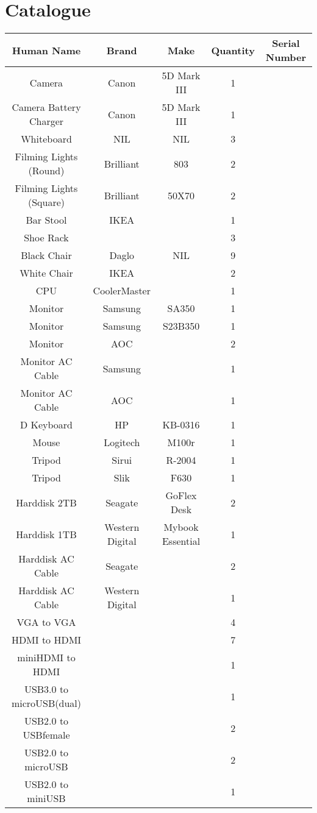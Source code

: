 \documentclass[DIV=classic,11pt,abstracton,numbers=noenddot,listof=totoc,bibliography=totoc,parskip]{scrartcl}
\title{}
\author{}
\date{}
\begin{document}
\section{Catalogue}

	\begin{tabular}{ccccc}
	\toprule
	Human Name & Brand & Make & Quantity & Serial Number\\ \midrule	
Camera & Canon & 5D Mark III & 1 & \\
Camera Battery Charger & Canon & 5D Mark III & 1 & \\
Whiteboard & NIL & NIL & 3 & \\
Filming Lights (Round) & Brilliant & 803 & 2 & \\
Filming Lights (Square) & Brilliant & 50X70 & 2 & \\
Bar Stool & IKEA & & 1 & \\
Shoe Rack &  & & 3 & \\
Black Chair & Daglo & NIL & 9 & \\
White Chair & IKEA & & 2 & \\
CPU & CoolerMaster &  & 1 & \\
Monitor & Samsung & SA350 & 1 & \\
Monitor & Samsung & S23B350 & 1 & \\
Monitor & AOC && 2 & \\
Monitor AC Cable & Samsung && 1 & \\
Monitor AC Cable & AOC && 1 & \\D
Keyboard & HP & KB-0316 & 1 & \\
Mouse & Logitech & M100r & 1 & \\
Tripod & Sirui & R-2004 & 1 & \\
Tripod & Slik & F630 & 1 & \\
Harddisk 2TB & Seagate & GoFlex Desk & 2 & \\ 
Harddisk 1TB & Western Digital & Mybook Essential & 1 & \\
Harddisk AC Cable & Seagate && 2 & \\
Harddisk AC Cable & Western Digital && 1 & \\
VGA to VGA &&& 4 & \\
HDMI to HDMI &&& 7 & \\
miniHDMI to HDMI &&& 1 &\\
USB3.0 to microUSB(dual) &&& 1 & \\
USB2.0 to USBfemale &&& 2 & \\
USB2.0 to microUSB &&& 2 & \\
USB2.0 to miniUSB &&& 1 & \\

\end{tabular}
\end{document}
